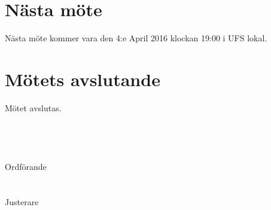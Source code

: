\documentclass[a4paper,11pt,oneside]{article}
\begin{document}
\section{Nästa möte}
Nästa möte kommer vara den 4:e April 2016 klockan 19:00 i UFS lokal.

\section{Mötets avslutande}
Mötet avslutas.
\\
\\
\\
\\
\\
Ordförande\hspace{0.2cm} \makebox[3in]{\hrulefill}
\\\\\\
Justerare\hspace{0.5cm} \makebox[3in]{\hrulefill}
\end{document}
